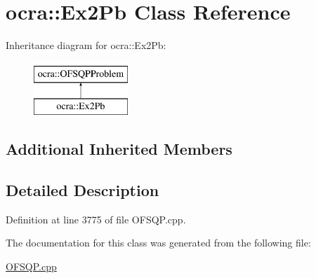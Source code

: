 \hypertarget{classocra_1_1Ex2Pb}{}\section{ocra\+:\+:Ex2\+Pb Class Reference}
\label{classocra_1_1Ex2Pb}
Inheritance diagram for ocra\+:\+:Ex2\+Pb\+:\begin{figure}[H]
\begin{center}
\leavevmode
\includegraphics[height=2.000000cm]{d4/d64/classocra_1_1Ex2Pb}
\end{center}
\end{figure}
\subsection*{Additional Inherited Members}


\subsection{Detailed Description}


Definition at line 3775 of file O\+F\+S\+Q\+P.\+cpp.



The documentation for this class was generated from the following file\+:\begin{DoxyCompactItemize}
\item 
\hyperlink{OFSQP_8cpp}{O\+F\+S\+Q\+P.\+cpp}\end{DoxyCompactItemize}
